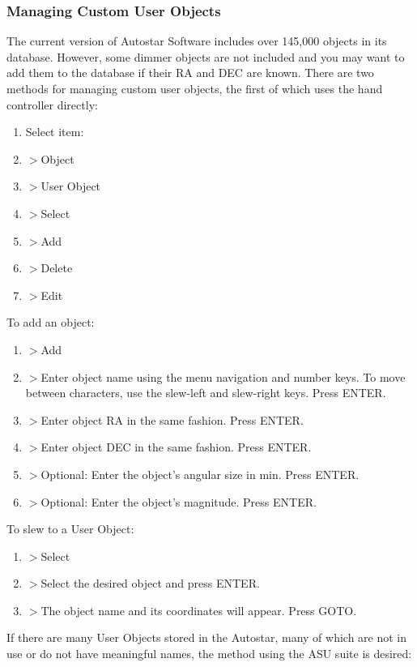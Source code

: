 \documentclass[12pt,titlepage]{article}
\begin{document}
\subsubsection{Managing Custom User Objects}
The current version of Autostar Software includes over 145,000 objects in its database.
However, some dimmer objects are not included and you may want to add them to the database if their RA and DEC are known.
There are two methods for managing custom user objects, the first of which uses the hand controller directly:
\begin{enumerate}
	\item[] Select item:
	\item[]\quad $>$Object
	\item[]\quad\quad $>$User Object
	\item[]\quad\quad\quad $>$Select
	\item[]\quad\quad\quad $>$Add
	\item[]\quad\quad\quad $>$Delete
	\item[]\quad\quad\quad $>$Edit
\end{enumerate}
To add an object:
\begin{enumerate}
	\item[]\quad\quad\quad $>$Add
	\item[]\quad\quad\quad\quad $>$Enter object name using the menu navigation and number keys.
	To move between characters, use the slew-left and slew-right keys. Press ENTER.
	\item[]\quad\quad\quad\quad $>$Enter object RA in the same fashion. Press ENTER. 
	\item[]\quad\quad\quad\quad $>$Enter object DEC in the same fashion. Press ENTER.
	\item[]\quad\quad\quad\quad $>$Optional: Enter the object's angular size in 
	min. Press ENTER.
	\item[]\quad\quad\quad\quad $>$Optional: Enter the object's magnitude. Press ENTER.
\end{enumerate}
To slew to a User Object:
\begin{enumerate}
	\item[]\quad\quad\quad $>$Select
	\item[]\quad\quad\quad\quad $>$Select the desired object and press ENTER.
	\item[]\quad\quad\quad\quad $>$The object name and its coordinates will appear. Press GOTO.
\end{enumerate}
If there are many User Objects stored in the Autostar, many of which are not in use or do not have meaningful names, the method using the ASU suite is desired:
\end{document}
